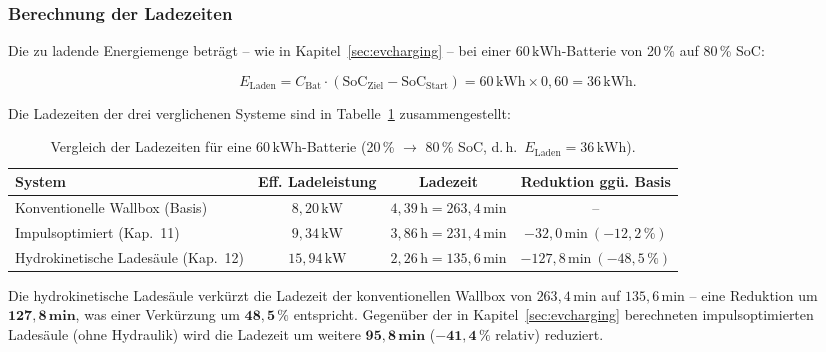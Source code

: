 ﻿\documentclass[a4paper,12pt]{article}
\begin{document}
\subsubsection{Berechnung der Ladezeiten}

Die zu ladende Energiemenge beträgt -- wie in Kapitel~\ref{sec:evcharging} --
bei einer $60\,\text{kWh}$-Batterie von 20\,\% auf 80\,\% SoC:

\begin{equation}
  E_\text{Laden} = C_\text{Bat}
                   \cdot (\text{SoC}_\text{Ziel} - \text{SoC}_\text{Start})
                 = 60\,\text{kWh} \times 0{,}60
                 = 36\,\text{kWh}.
  \label{eq:E_laden}
\end{equation}

Die Ladezeiten der drei verglichenen Systeme sind in
Tabelle~\ref{tab:ladezeiten_vergleich} zusammengestellt:

\begin{table}
  \centering
  \caption{Vergleich der Ladezeiten für eine $60\,\text{kWh}$-Batterie
           (20\,\% $\to$ 80\,\% SoC, d.\,h.\ $E_\text{Laden} = 36\,\text{kWh}$).}
  \label{tab:ladezeiten_vergleich}
  \begin{tabular}{lccc}
    \toprule
    \textbf{System} & \textbf{Eff. Ladeleistung} & \textbf{Ladezeit} & \textbf{Reduktion ggü. Basis} \\
    \midrule
    Konventionelle Wallbox (Basis)          & $8{,}20\,\text{kW}$  & $4{,}39\,\text{h} = 263{,}4\,\text{min}$ & -- \\
    Impulsoptimiert (Kap.~11)               & $9{,}34\,\text{kW}$  & $3{,}86\,\text{h} = 231{,}4\,\text{min}$ & $-32{,}0\,\text{min}\ (-12{,}2\,\%)$ \\
    Hydrokinetische Ladesäule (Kap.~12)     & $15{,}94\,\text{kW}$ & $2{,}26\,\text{h} = 135{,}6\,\text{min}$ & $-127{,}8\,\text{min}\ (-48{,}5\,\%)$ \\
    \bottomrule
  \end{tabular}
\end{table}

Die hydrokinetische Ladesäule verkürzt die Ladezeit der konventionellen
Wallbox von $263{,}4\,\text{min}$ auf $135{,}6\,\text{min}$ -- eine
Reduktion um $\mathbf{127{,}8\,\text{min}}$, was einer Verkürzung um
$\mathbf{48{,}5\,\%}$ entspricht. Gegenüber der in Kapitel~\ref{sec:evcharging}
berechneten impulsoptimierten Ladesäule (ohne Hydraulik) wird die Ladezeit
um weitere $\mathbf{95{,}8\,\text{min}}$ ($\mathbf{-41{,}4\,\%}$ relativ)
reduziert.
\end{document}
